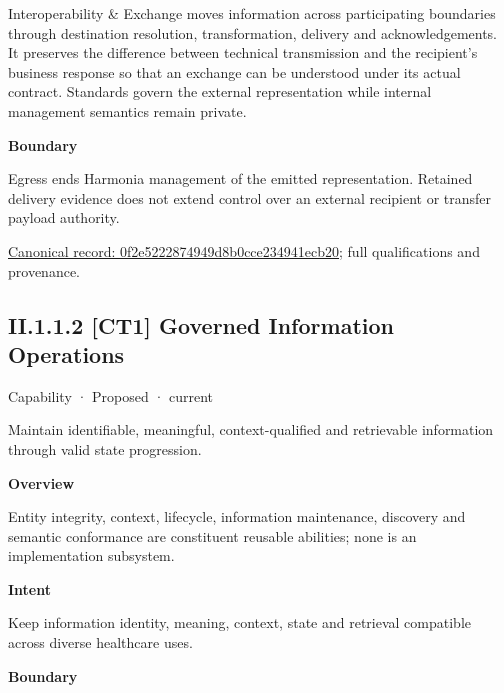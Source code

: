 Interoperability \& Exchange moves information across participating boundaries through destination resolution, transformation, delivery and acknowledgements. It preserves the difference between technical transmission and the recipient's business response so that an exchange can be understood under its actual contract. Standards govern the external representation while internal management semantics remain private.



\textbf{Boundary}



Egress ends Harmonia management of the emitted representation. Retained delivery evidence does not extend control over an external recipient or transfer payload authority.


{\footnotesize \href{../../../../continuum/strategy/capability/0f2e5222874949d8b0cce234941ecb20.md}{Canonical record: 0f2e5222874949d8b0cce234941ecb20}; full qualifications and provenance.}\par
\subsection*{II.1.1.2 [CT1] Governed Information Operations}
\label{navigation:II.1.1.2}

\label{element:15e57021490c4e738aee9009ff84a7c3}
{\small Capability · Proposed · current}\par

Maintain identifiable, meaningful, context-qualified and retrievable information through valid state progression.



\textbf{Overview}



Entity integrity, context, lifecycle, information maintenance, discovery and semantic conformance are constituent reusable abilities; none is an implementation subsystem.



\textbf{Intent}



Keep information identity, meaning, context, state and retrieval compatible across diverse healthcare uses.



\textbf{Boundary}



